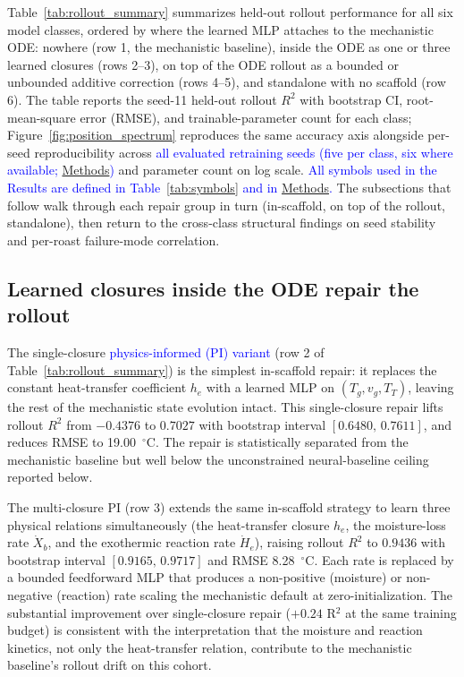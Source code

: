 \documentclass[fleqn,10pt]{wlscirep}
\newcommand{\rev}[1]{\textcolor{blue}{#1}}
\newcommand{\Methods}{\hyperref[sec:methods]{Methods}}
\begin{document}
Table~\ref{tab:rollout_summary} summarizes held-out rollout performance for all six model classes, ordered by where the learned MLP attaches to the mechanistic ODE: nowhere (row 1, the mechanistic baseline), inside the ODE as one or three learned closures (rows 2--3), on top of the ODE rollout as a bounded or unbounded additive correction (rows 4--5), and standalone with no scaffold (row 6). The table reports the seed-11 held-out rollout $R^2$ with bootstrap CI, root-mean-square error (RMSE), and trainable-parameter count for each class; Figure~\ref{fig:position_spectrum} reproduces the same accuracy axis alongside per-seed reproducibility across \rev{all evaluated retraining seeds (five per class, six where available; \Methods)} and parameter count on log scale. \rev{All symbols used in the Results are defined in Table~\ref{tab:symbols} and in \Methods.} The subsections that follow walk through each repair group in turn (in-scaffold, on top of the rollout, standalone), then return to the cross-class structural findings on seed stability and per-roast failure-mode correlation.

\subsection*{Learned closures inside the ODE repair the rollout}

The single-closure \rev{physics-informed (PI) variant} (row 2 of Table~\ref{tab:rollout_summary}) is the simplest in-scaffold repair: it replaces the constant heat-transfer coefficient $h_e$ with a learned MLP on $(T_g, v_g, T_T)$, leaving the rest of the mechanistic state evolution intact. This single-closure repair lifts rollout $R^2$ from $-0.4376$ to $0.7027$ with bootstrap interval $[0.6480,\,0.7611]$, and reduces RMSE to 19.00~$^\circ$C. The repair is statistically separated from the mechanistic baseline but well below the unconstrained neural-baseline ceiling reported below.

The multi-closure PI (row 3) extends the same in-scaffold strategy to learn three physical relations simultaneously (the heat-transfer closure $h_e$, the moisture-loss rate $\dot{X}_b$, and the exothermic reaction rate $\dot{H}_e$), raising rollout $R^2$ to $0.9436$ with bootstrap interval $[0.9165,\,0.9717]$ and RMSE 8.28~$^\circ$C. Each rate is replaced by a bounded feedforward MLP that produces a non-positive (moisture) or non-negative (reaction) rate scaling the mechanistic default at zero-initialization. The substantial improvement over single-closure repair ($+0.24$ R$^2$ at the same training budget) is consistent with the interpretation that the moisture and reaction kinetics, not only the heat-transfer relation, contribute to the mechanistic baseline's rollout drift on this cohort.
\end{document}
